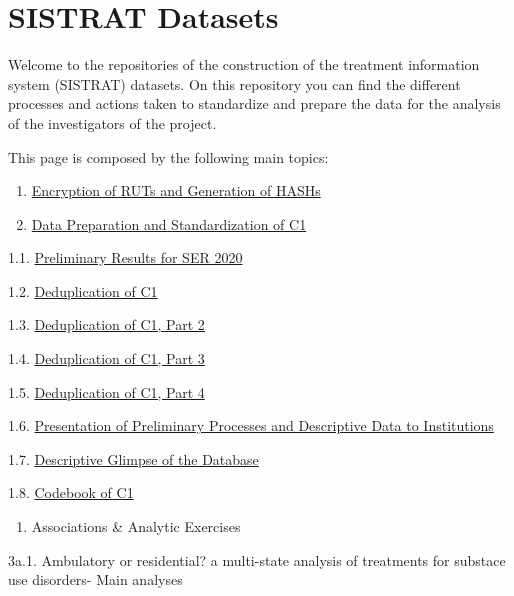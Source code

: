\documentclass[
]{article}
\author{}
\date{\vspace{-2.5em}}
\providecommand{\tightlist}{%
  \setlength{\itemsep}{0pt}\setlength{\parskip}{0pt}}
\begin{document}
\hypertarget{sistrat-datasets}{%
\section{SISTRAT Datasets}\label{sistrat-datasets}}

Welcome to the repositories of the construction of the treatment
information system (SISTRAT) datasets. On this repository you can find
the different processes and actions taken to standardize and prepare the
data for the analysis of the investigators of the project.

This page is composed by the following main topics:

\begin{enumerate}
\def\labelenumi{\arabic{enumi}.}
\item
  \href{Encript.html}{Encryption of RUTs and Generation of HASHs}
\item
  \href{Data_prep_C1}{Data Preparation and Standardization of C1}
\end{enumerate}

1.1. \href{SER_Stata.html}{Preliminary Results for SER 2020}

1.2. \href{Duplicates}{Deduplication of C1}

1.3. \href{Duplicates2}{Deduplication of C1, Part 2}

1.4. \href{Duplicates3}{Deduplication of C1, Part 3}

1.5. \href{Duplicates4}{Deduplication of C1, Part 4}

1.6. \href{Presentación2}{Presentation of Preliminary Processes and
Descriptive Data to Institutions}

1.7. \href{Desc}{Descriptive Glimpse of the Database}

1.8. \href{codebook}{Codebook of C1}

\begin{enumerate}
\def\labelenumi{\arabic{enumi}.}
\setcounter{enumi}{2}
\tightlist
\item
  Associations \& Analytic Exercises
\end{enumerate}

3a.1. Ambulatory or residential? a multi-state analysis of treatments
for substace use disorders- Main analyses
\end{document}
